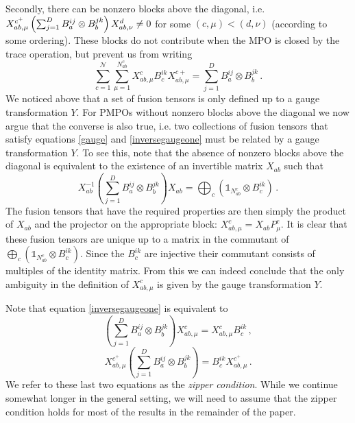 \documentclass[12 pt]{article}
\begin{document}
Secondly, there can be nonzero blocks above the diagonal, i.e.\ $X_{ab,\mu}^{c^+}\left(\sum_{j = 1}^D B_a^{ij}\otimes B_b^{jk}\right)\\ X^{d}_{ab,\nu}  \neq 0$ for some $(c,\mu) < (d,\nu)$ (according to some ordering). These blocks do not contribute when the MPO is closed by the trace operation, but prevent us from writing
\begin{equation}\label{inversegaugeone}
    \sum_{c = 1}^{\mathcal{N}}\sum_{\mu=1}^{N_{ab}^c} X_{ab,\mu}^c B_c^{ik} X_{ab,\mu}^{c+} = \sum_{j=1}^D B^{ij}_a\otimes B^{jk}_b\, .
\end{equation}
We noticed above that a set of fusion tensors is only defined up to a gauge transformation $Y$. For PMPOs without nonzero blocks above the diagonal we now argue that the converse is also true, i.e. two  collections of fusion tensors that satisfy equations \eqref{gauge} and \eqref{inversegaugeone} must be related by a gauge transformation $Y$. To see this, note that the absence of nonzero blocks above the diagonal is equivalent to the existence of an invertible matrix $X_{ab}$ such that
\begin{equation}
    X_{ab}^{-1}\left(\sum_{j = 1}^D B_a^{ij}\otimes B_b^{jk}\right)X_{ab}=  \bigoplus_{c}\left(\mathds{1}_{N_{ab}^c} \otimes B_c^{ik}\right)\, .
\end{equation}
The fusion tensors that have the required properties are then simply the product of $X_{ab}$ and the projector on the appropriate block: $X^c_{ab,\mu} = X_{ab} P^c_{\mu}$. It is clear that these fusion tensors are unique up to a matrix in the commutant of $\bigoplus_{c}\left(\mathds{1}_{N_{ab}^c} \otimes B_c^{ik}\right)$. Since the $B^{ik}_c$ are injective their commutant consists of multiples of the identity matrix. From this we can indeed conclude that the only ambiguity in the definition of $X_{ab,\mu}^c$ is given by the gauge transformation $Y$.

Note that equation \eqref{inversegaugeone} is equivalent to
\begin{equation}\label{zippercondition2}
    \left(\sum_{j=1}^D B^{ij}_a\otimes B^{jk}_b\right) X_{ab,\mu}^{c} = X_{ab,\mu}^{c} B^{ik}_{c}\, ,
\end{equation}
\begin{equation*}
    X_{ab,\mu}^{c^+} \left(\sum_{j=1}^D B^{ij}_a\otimes B^{jk}_b\right)  =B^{ik}_{c} X_{ab,\mu}^{c^+} \, .
\end{equation*}
We refer to these last two equations as the \emph{zipper condition}. While we continue somewhat longer in the general setting, we will need to assume that the zipper condition holds for most of the results in the remainder of the paper.
\end{document}
